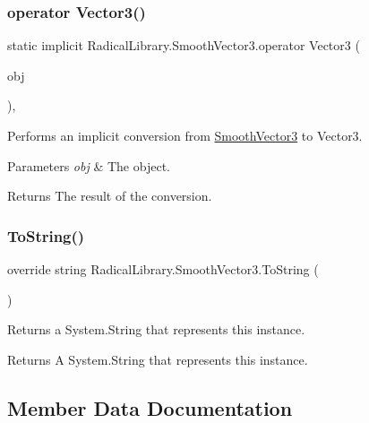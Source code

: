 \subsubsection{\texorpdfstring{operator Vector3()}{operator Vector3()}}
{\footnotesize\ttfamily static implicit Radical\+Library.\+Smooth\+Vector3.\+operator Vector3 (\begin{DoxyParamCaption}\item[{\hyperlink{class_radical_library_1_1_smooth_vector3}{Smooth\+Vector3}}]{obj }\end{DoxyParamCaption})\hspace{0.3cm}{\ttfamily [inline]}, {\ttfamily [static]}}



Performs an implicit conversion from \hyperlink{class_radical_library_1_1_smooth_vector3}{Smooth\+Vector3} to Vector3. 


\begin{DoxyParams}{Parameters}
{\em obj} & The object.\\
\hline
\end{DoxyParams}
\begin{DoxyReturn}{Returns}
The result of the conversion.
\end{DoxyReturn}
\mbox{\label{class_radical_library_1_1_smooth_vector3_ad0c65a7f1c1ee33822d7be53a02beb23}} 
\subsubsection{\texorpdfstring{To\+String()}{ToString()}}
{\footnotesize\ttfamily override string Radical\+Library.\+Smooth\+Vector3.\+To\+String (\begin{DoxyParamCaption}{ }\end{DoxyParamCaption})\hspace{0.3cm}{\ttfamily [inline]}}



Returns a System.\+String that represents this instance. 

\begin{DoxyReturn}{Returns}
A System.\+String that represents this instance.
\end{DoxyReturn}


\subsection{Member Data Documentation}
\mbox{\label{class_radical_library_1_1_smooth_vector3_af2a047088e4e9dd49cf95202782d36c1}} 
